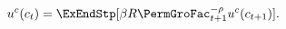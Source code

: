   \begin{equation}\begin{gathered}\begin{aligned}
        \uFunc^{{c}}({c}_{\prd})  & = \ExEndStp[\DiscFac\Rfree \PermGroFac_{\prd+1}^{-\CRRA}\uFunc^{{c}}({c}_{\prd+1})] \label{eq:cEuler}.
      \end{aligned}\end{gathered}\end{equation}
